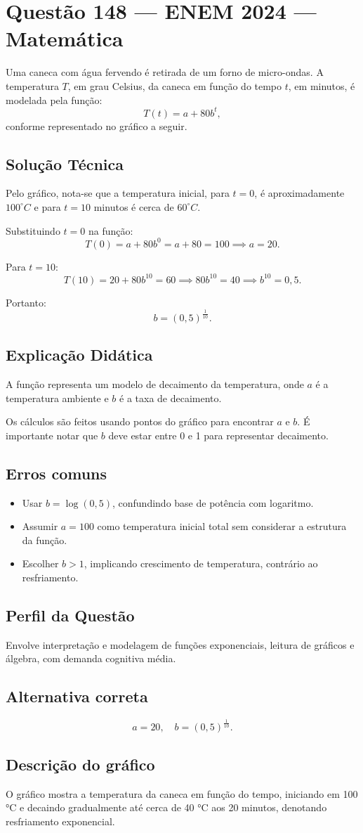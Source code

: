 \documentclass{article}
\begin{document}
\section*{Questão 148 — ENEM 2024 — Matemática}

Uma caneca com água fervendo é retirada de um forno de micro-ondas. A temperatura \( T \), em grau Celsius, da caneca em função do tempo \( t \), em minutos, é modelada pela função:
\[
T(t) = a + 80 b^t,
\]
conforme representado no gráfico a seguir.

\subsection*{Solução Técnica}
Pelo gráfico, nota-se que a temperatura inicial, para \( t=0 \), é aproximadamente \( 100 ^\circ C \) e para \( t=10 \) minutos é cerca de \( 60 ^\circ C \).

Substituindo \( t=0 \) na função:
\[
T(0) = a + 80 b^0 = a + 80 = 100 \implies a = 20.
\]

Para \( t=10 \):
\[
T(10) = 20 + 80 b^{10} = 60 \implies 80 b^{10} = 40 \implies b^{10} = 0,5.
\]

Portanto:
\[
b = (0,5)^{\frac{1}{10}}.
\]

\subsection*{Explicação Didática}
A função representa um modelo de decaimento da temperatura, onde \( a \) é a temperatura ambiente e \( b \) é a taxa de decaimento.

Os cálculos são feitos usando pontos do gráfico para encontrar \( a \) e \( b \). É importante notar que \( b \) deve estar entre 0 e 1 para representar decaimento.

\subsection*{Erros comuns}
\begin{itemize}
  \item Usar \( b = \log(0,5) \), confundindo base de potência com logaritmo.
  \item Assumir \( a = 100 \) como temperatura inicial total sem considerar a estrutura da função.
  \item Escolher \( b > 1 \), implicando crescimento de temperatura, contrário ao resfriamento.
\end{itemize}

\subsection*{Perfil da Questão}
Envolve interpretação e modelagem de funções exponenciais, leitura de gráficos e álgebra, com demanda cognitiva média.

\subsection*{Alternativa correta}
\[
a = 20, \quad b = (0,5)^{\frac{1}{10}}.
\]

\subsection*{Descrição do gráfico}
O gráfico mostra a temperatura da caneca em função do tempo, iniciando em 100 °C e decaindo gradualmente até cerca de 40 °C aos 20 minutos, denotando resfriamento exponencial.
\end{document}
